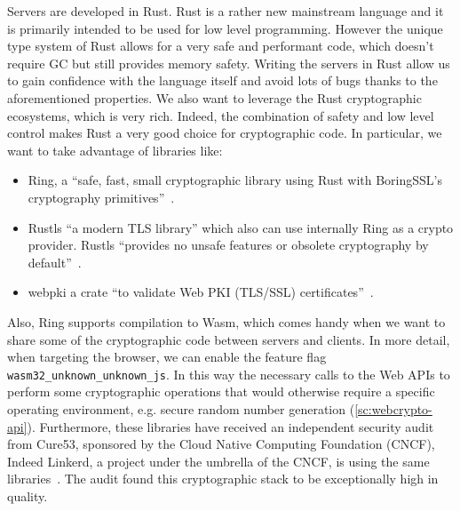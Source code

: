 Servers are developed in Rust. Rust is a rather new mainstream language
and it is primarily intended to be used for low level
programming. However the unique type system of Rust
allows for a very safe and performant code, which doesn't
require GC but still provides memory safety.
Writing the servers in Rust allow us to gain confidence
with the language itself and avoid lots of bugs thanks to the
aforementioned properties.
We also want to leverage the Rust cryptographic
ecosystems, which is very rich. Indeed, the combination of
safety and low level control makes Rust a very good choice
for cryptographic code. In particular, we want to take
advantage of libraries like:
\begin{itemize}
    \item Ring, a ``safe, fast, small cryptographic library using Rust with BoringSSL's cryptography primitives''~\cite{Ring}.
    \item Rustls ``a modern TLS library'' which also can use internally Ring as a crypto provider. Rustls ``provides no unsafe features or obsolete cryptography by default''~\cite{Rustls}.
    \item webpki a crate ``to validate Web PKI (TLS/SSL) certificates''~\cite{WebpkiCrate}.
\end{itemize}
Also, Ring supports compilation to Wasm, which comes handy
when we want to share some of the cryptographic code
between servers and clients. In more detail, when targeting the
browser, we can enable the feature flag \texttt{wasm32\_unknown\_unknown\_js}.
In this way the necessary calls to the Web APIs
to perform some cryptographic operations that would
otherwise require a specific operating environment,
e.g. secure random number generation (\cref{sc:webcrypto-api}).
Furthermore, these libraries have received an independent security audit 
from Cure53, sponsored by the Cloud Native Computing Foundation (CNCF),
Indeed Linkerd, a project under the umbrella of the CNCF, is using the same libraries~\cite{RustlsAudit}.
The audit found this cryptographic stack to be exceptionally high in quality.

